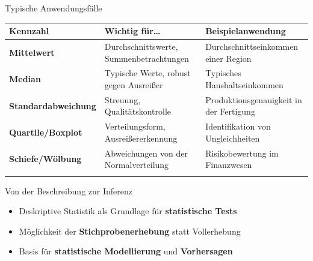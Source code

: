 \documentclass[
  ignorenonframetext,
]{beamer}
\newcounter{none} %
\providecommand{\tightlist}{%
  \setlength{\itemsep}{0pt}\setlength{\parskip}{0pt}}
\begin{document}
\begin{frame}{Typische Anwendungsfälle}
\protect{}\label{typische-anwendungsfuxe4lle}
{\def\LTcaptype{none} %
\begin{longtable}[]{@{}
  >{\raggedright\arraybackslash}p{}
  >{\raggedright\arraybackslash}p{}
  >{\raggedright\arraybackslash}p{}@{}}
\toprule\noalign{}
\begin{minipage}[b]{\linewidth}\raggedright
Kennzahl
\end{minipage} & \begin{minipage}[b]{\linewidth}\raggedright
Wichtig für\ldots{}
\end{minipage} & \begin{minipage}[b]{\linewidth}\raggedright
Beispielanwendung
\end{minipage} \\
\midrule\noalign{}
\endhead
\textbf{Mittelwert} & Durchschnittswerte, Summenbetrachtungen &
Durchschnittseinkommen einer Region \\
\textbf{Median} & Typische Werte, robust gegen Ausreißer & Typisches
Haushaltseinkommen \\
\textbf{Standardabweichung} & Streuung, Qualitätskontrolle &
Produktionsgenauigkeit in der Fertigung \\
\textbf{Quartile/Boxplot} & Verteilungsform, Ausreißererkennung &
Identifikation von Ungleichheiten \\
\textbf{Schiefe/Wölbung} & Abweichungen von der Normalverteilung &
Risikobewertung im Finanzwesen \\
\bottomrule\noalign{}
\end{longtable}
}
\end{frame}

\begin{frame}{Von der Beschreibung zur Inferenz}
\protect{}\label{von-der-beschreibung-zur-inferenz}
\begin{itemize}
\tightlist
\item
  Deskriptive Statistik als Grundlage für \textbf{statistische Tests}
\item
  Möglichkeit der \textbf{Stichprobenerhebung} statt Vollerhebung
\item
  Basis für \textbf{statistische Modellierung} und \textbf{Vorhersagen}
\end{itemize}
\end{frame}
\end{document}
